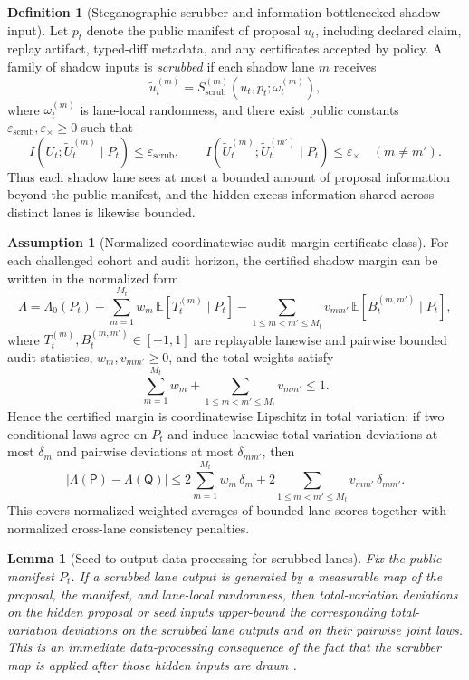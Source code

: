 \documentclass[11pt]{article}
\newtheorem{lemma}[theorem]{Lemma}
\theoremstyle{definition}
\newtheorem{definition}[theorem]{Definition}
\newtheorem{assumption}[theorem]{Assumption}
\newcommand{\E}{\mathbb{E}}
\newcommand{\1}{\mathbf{1}}
\newcommand{\abs}[1]{\left\lvert #1 \right\rvert}
\begin{document}
\begin{definition}[Steganographic scrubber and information-bottlenecked shadow input]\label{def:scrubber}
Let $p_t$ denote the public manifest of proposal $u_t$, including declared claim, replay artifact, typed-diff metadata, and any certificates accepted by policy. A family of shadow inputs is \emph{scrubbed} if each shadow lane $m$ receives
\[
\tilde u_t^{(m)} = S^{(m)}_{\mathrm{scrub}}(u_t,p_t;\omega_t^{(m)}),
\]
where $\omega_t^{(m)}$ is lane-local randomness, and there exist public constants $\varepsilon_{\mathrm{scrub}},\varepsilon_{\times}\ge 0$ such that
\[
I\!\left(U_t;\tilde U_t^{(m)}\mid P_t\right)\le \varepsilon_{\mathrm{scrub}},
\qquad
I\!\left(\tilde U_t^{(m)};\tilde U_t^{(m')}\mid P_t\right)\le \varepsilon_{\times}
\quad(m\neq m').
\]
Thus each shadow lane sees at most a bounded amount of proposal information beyond the public manifest, and the hidden excess information shared across distinct lanes is likewise bounded.
\end{definition}

\begin{assumption}[Normalized coordinatewise audit-margin certificate class]\label{ass:audit_margin_lipschitz}
For each challenged cohort and audit horizon, the certified shadow margin can be written in the normalized form
\[
\Lambda
=
\Lambda_0(P_t)
+
\sum_{m=1}^{M_t} w_m \, \E[T_t^{(m)}\mid P_t]
-
\sum_{1\le m<m'\le M_t} v_{mm'} \, \E[B_t^{(m,m')}\mid P_t],
\]
where $T_t^{(m)},B_t^{(m,m')}\in[-1,1]$ are replayable lanewise and pairwise bounded audit statistics, $w_m,v_{mm'}\ge 0$, and the total weights satisfy
\[
\sum_{m=1}^{M_t} w_m + \sum_{1\le m<m'\le M_t} v_{mm'} \le 1.
\]
Hence the certified margin is coordinatewise Lipschitz in total variation: if two conditional laws agree on $P_t$ and induce lanewise total-variation deviations at most $\delta_m$ and pairwise deviations at most $\delta_{mm'}$, then
\[
\abs{\Lambda(\mathsf P)-\Lambda(\mathsf Q)}
\le 2\sum_{m=1}^{M_t} w_m \, \delta_m
+2\sum_{1\le m<m'\le M_t} v_{mm'} \, \delta_{mm'}.
\]
This covers normalized weighted averages of bounded lane scores together with normalized cross-lane consistency penalties.
\end{assumption}

\begin{lemma}[Seed-to-output data processing for scrubbed lanes]\label{lem:seed_output_tv}
Fix the public manifest $P_t$. If a scrubbed lane output is generated by a measurable map of the proposal, the manifest, and lane-local randomness, then total-variation deviations on the hidden proposal or seed inputs upper-bound the corresponding total-variation deviations on the scrubbed lane outputs and on their pairwise joint laws. This is an immediate data-processing consequence of the fact that the scrubber map is applied after those hidden inputs are drawn \cite[Chapters~2 and~17]{CoverThomas2006}.
\end{lemma}
\end{document}
